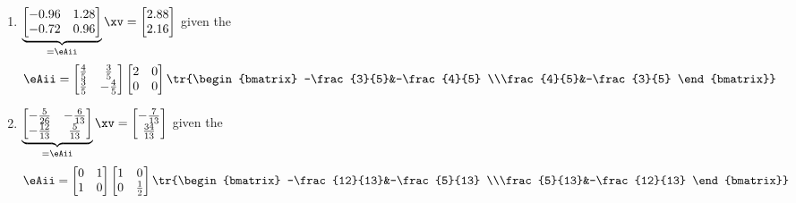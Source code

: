 \begin{exercise}
\begin{enumerate}
\item \(\underbrace{\begin{bmatrix} -0.96&1.28
\\-0.72&0.96 \end{bmatrix}}_{=\eAii}\xv
=\begin{bmatrix} 2.88
\\2.16 \end{bmatrix}\) given the \svd
\begin{equation*}
\eAii=\begin{bmatrix} \frac{4}{5}&\frac{3}{5}
\\\frac{3}{5}&-\frac{4}{5} \end{bmatrix}
\begin{bmatrix} 2&0
\\0&0 \end{bmatrix}
\tr{\begin{bmatrix} -\frac{3}{5}&-\frac{4}{5}
\\\frac{4}{5}&-\frac{3}{5} \end{bmatrix}}
\end{equation*}

\item \(\underbrace{\begin{bmatrix} -\frac{5}{26}&-\frac{6}{13}
\\-\frac{12}{13}&\frac{5}{13} \end{bmatrix}}_{=\eAii}\xv
=\begin{bmatrix} -\frac{7}{13}
\\\frac{34}{13} \end{bmatrix}\) given the \svd
\begin{equation*}
\eAii=\begin{bmatrix} 0&1
\\1&0 \end{bmatrix}
\begin{bmatrix} 1&0
\\0&\frac{1}{2} \end{bmatrix}
\tr{\begin{bmatrix} -\frac{12}{13}&-\frac{5}{13}
\\\frac{5}{13}&-\frac{12}{13} \end{bmatrix}}
\end{equation*}


\end{enumerate}
\end{exercise}
